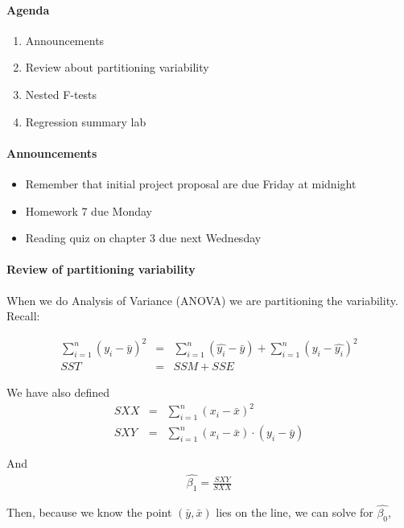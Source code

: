 \documentclass[10pt]{article}
\begin{document}


\paragraph{Agenda}
\begin{enumerate}
  \itemsep0em
  \item Announcements
  \item Review about partitioning variability
  \item Nested F-tests
  \item Regression summary lab
\end{enumerate}

\paragraph{Announcements}
\begin{itemize}
\item Remember that initial project proposal are due Friday at midnight
\item Homework 7 due Monday
\item Reading quiz on chapter 3 due next Wednesday
\end{itemize}

\paragraph{Review of partitioning variability}
When we do Analysis of Variance (ANOVA) we are partitioning the variability. Recall:

\begin{eqnarray*}
\sum_{i=1}^n (y_i -\bar{y})^2 &=& \sum_{i=1}^n (\hat{y_i}-\bar{y}) + \sum_{i=1}^n (y_i-\hat{y_i})^2 \\
SST &=& SSM + SSE
\end{eqnarray*}

We have also defined
\begin{eqnarray*}
SXX &=& \sum_{i=1}^n (x_i - \bar{x})^2 \\
SXY &=& \sum_{i=1}^n (x_i - \bar{x})\cdot(y_i - \bar{y})
\end{eqnarray*}

And
\begin{eqnarray*}
\hat{\beta_1} = \frac{SXY}{SXX}
\end{eqnarray*}

Then, because we know the point $(\bar{y}, \bar{x})$ lies on the line, we can solve for $\hat{\beta_0}$,
\end{document}
